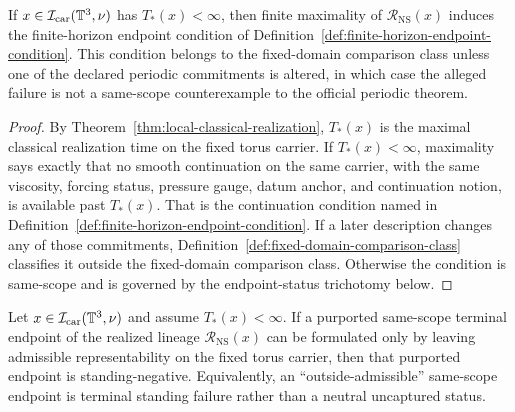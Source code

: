 \begin{manualtheorem}
\label{thm:finite-horizon-failure-induces-endpoint-condition}
If $x\in\mathcal I_{\mathrm{car}}(\mathbb{T}^3,\nu)$ has $T_*(x)<\infty$, then finite maximality of $\mathcal R_{\mathrm{NS}}(x)$ induces the finite-horizon endpoint condition of Definition~\ref{def:finite-horizon-endpoint-condition}. This condition belongs to the fixed-domain comparison class unless one of the declared periodic commitments is altered, in which case the alleged failure is not a same-scope counterexample to the official periodic theorem.
\end{manualtheorem}

\begin{proof}
By Theorem~\ref{thm:local-classical-realization}, $T_*(x)$ is the maximal classical realization time on the fixed torus carrier. If $T_*(x)<\infty$, maximality says exactly that no smooth continuation on the same carrier, with the same viscosity, forcing status, pressure gauge, datum anchor, and continuation notion, is available past $T_*(x)$. That is the continuation condition named in Definition~\ref{def:finite-horizon-endpoint-condition}. If a later description changes any of those commitments, Definition~\ref{def:fixed-domain-comparison-class} classifies it outside the fixed-domain comparison class. Otherwise the condition is same-scope and is governed by the endpoint-status trichotomy below.
\end{proof}

\begin{manualproposition}
\label{prop:exterior-endpoint-standing-failure}
Let $x\in\mathcal I_{\mathrm{car}}(\mathbb{T}^3,\nu)$ and assume $T_*(x)<\infty$. If a purported same-scope terminal endpoint of the realized lineage $\mathcal R_{\mathrm{NS}}(x)$ can be formulated only by leaving admissible representability on the fixed torus carrier, then that purported endpoint is standing-negative. Equivalently, an ``outside-admissible'' same-scope endpoint is terminal standing failure rather than a neutral uncaptured status.
\end{manualproposition}

